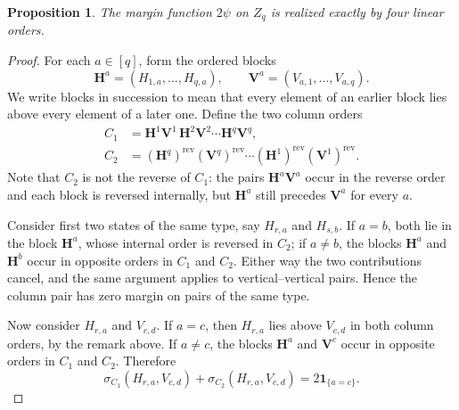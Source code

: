 \documentclass[10pt,a4paper]{amsart}
\newtheorem{proposition}{Proposition}
\newcommand{\one}{\mathbf{1}}
\newcommand{\rev}{\mathrm{rev}}
\begin{document}
\begin{proposition}\label{prop:four-orders}
The margin function $2\psi$ on $Z_q$ is realized exactly by four linear
orders.
\end{proposition}

\begin{proof}
For each $a\in[q]$, form the ordered blocks
\[
  \mathbf H^a=(H_{1,a},\ldots,H_{q,a}),
  \qquad
  \mathbf V^a=(V_{a,1},\ldots,V_{a,q}).
\]
We write blocks in succession to mean that every element of an earlier block lies above every element of a later one. Define the two column orders
\begin{align*}
  C_1&=\mathbf H^1\mathbf V^1\,
       \mathbf H^2\mathbf V^2\cdots
       \mathbf H^q\mathbf V^q,\\
  C_2&=(\mathbf H^q)^{\rev}(\mathbf V^q)^{\rev}\cdots
       (\mathbf H^1)^{\rev}(\mathbf V^1)^{\rev}.
\end{align*}
Note that $C_2$ is not the reverse of $C_1$: the pairs $\mathbf H^a\mathbf V^a$ occur in the reverse order and each block is
reversed internally, but $\mathbf H^a$ still precedes $\mathbf V^a$ for every $a$.

Consider first two states of the same type, say $H_{r,a}$ and
$H_{s,b}$.  If $a=b$, both lie in the block $\mathbf H^a$, whose
internal order is reversed in $C_2$; if $a\ne b$, the blocks
$\mathbf H^a$ and $\mathbf H^b$ occur in opposite orders in $C_1$ and $C_2$.  Either way the two contributions cancel, and the same argument
applies to vertical--vertical pairs. Hence the column pair has zero
margin on pairs of the same type.

Now consider $H_{r,a}$ and $V_{c,d}$.  If $a=c$, then $H_{r,a}$ lies above $V_{c,d}$ in both column orders, by the remark above.  If
$a\ne c$, the blocks $\mathbf H^a$ and $\mathbf V^c$ occur in opposite orders in $C_1$ and $C_2$.  Therefore
\begin{equation}\label{eq:column-pair}
  \sigma_{C_1}(H_{r,a},V_{c,d})+
  \sigma_{C_2}(H_{r,a},V_{c,d})
  =2\one_{\{a=c\}}.
\end{equation}


\end{proof}
\end{document}
